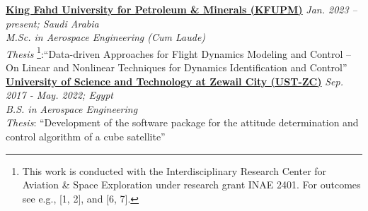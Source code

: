 \href{https://kfupm.edu.sa/}{\textbf{King Fahd University for Petroleum \& Minerals (KFUPM)}}
\hfill {\textit{Jan. 2023 – present; Saudi Arabia}}\\
\textit{M.Sc. in Aerospace Engineering (Cum Laude)}\\
\textit{Thesis}
\footnote{This work is conducted with the Interdisciplinary Research Center for Aviation \& Space Exploration under research grant INAE 2401. For outcomes see e.g., [1, 2], and [6, 7].}:``Data-driven Approaches for Flight Dynamics Modeling and Control -- On Linear and Nonlinear
Techniques for Dynamics Identification and Control''\\


\vspace{0.1 cm}
\href{https://zewailcity.edu.eg/}{\textbf{University of Science and Technology at Zewail City (UST-ZC)}}
\hfill {\textit{Sep. 2017 - May. 2022; Egypt}}\\
\textit{B.S. in Aerospace Engineering}\\
\textit{Thesis}: {``Development of the software package for the attitude determination and control
algorithm of a cube satellite''} \\
